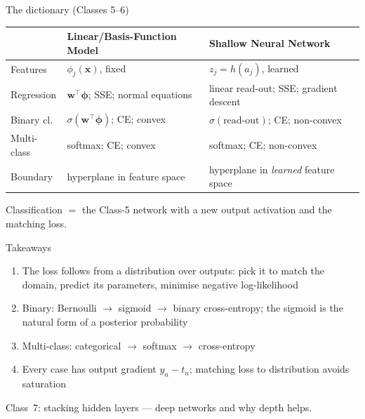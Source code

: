 \documentclass[aspectratio=169, 11pt]{beamer}
\begin{document}
\begin{frame}{The dictionary (Classes 5--6)}
  \centering
  \renewcommand{\arraystretch}{1.12}
  {\footnotesize
  \begin{tabular}{p{} p{}
                  p{}}
    & \textbf{\color{mlc}Linear/Basis-Function Model}
    & \textbf{\color{nnc}Shallow Neural Network}\\
    \hline
    Features
      & $\phi_j(\mathbf{x})$, fixed
      & $z_j = h(a_j)$, learned\\
    Regression
      & $\mathbf{w}^{\!\top}\boldsymbol{\phi}$; SSE;
        normal equations
      & linear read-out; SSE; gradient descent\\
    Binary cl.
      & $\sigma(\mathbf{w}^{\!\top}
        \boldsymbol{\phi})$; CE; convex
      & $\sigma(\text{read-out})$; CE; non-convex\\
    Multi-class
      & softmax; CE; convex
      & softmax; CE; non-convex\\
    Boundary
      & hyperplane in feature space
      & hyperplane in \emph{learned} feature space\\
    \hline
  \end{tabular}}
  \vspace{0.5em}
  \begin{redhighlight}
    Classification $=$ the Class-5 network with a new
    output activation and the matching loss.
  \end{redhighlight}
\end{frame}

\begin{frame}{Takeaways}
  \begin{enumerate}\setlength{\itemsep}{2pt}
    \item The loss follows from a \alert{distribution
          over outputs}: pick it to match the domain,
          predict its parameters, minimise negative
          log-likelihood
    \item Binary: Bernoulli $\to$ sigmoid $\to$ binary
          cross-entropy; the sigmoid is the natural form
          of a \alert{posterior probability}
    \item Multi-class: categorical $\to$ softmax $\to$
          cross-entropy
    \item Every case has output gradient
          \alert{$y_n-t_n$}; matching loss to
          distribution avoids saturation
  \end{enumerate}
  \vspace{0.3em}
  \begin{redhighlight}
    Class~7: stacking hidden layers ---
    \alert{deep networks} and why depth helps.
  \end{redhighlight}
\end{frame}
\end{document}

